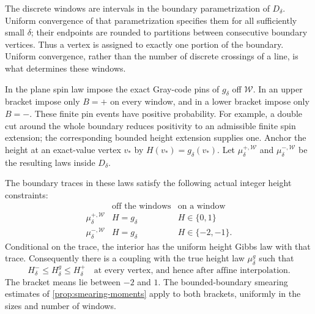 The discrete windows are intervals in the boundary parametrization of
$D_\delta$.  Uniform convergence of that parametrization specifies
them for all sufficiently small $\delta$; their endpoints are rounded
to partitions between consecutive boundary vertices.  Thus a vertex
is assigned to exactly one portion of the boundary.  Uniform
convergence, rather than the number of discrete crossings of a line,
is what determines these windows.

In the plane spin law impose the exact Gray-code pins of $g_\delta$
off $\mathcal W$.  In an upper bracket impose only $B=+$ on every
window, and in a lower bracket impose only $B=-$.  These finite pin
events have positive probability.  For example, a double cut around
the whole boundary reduces positivity to an admissible finite spin
extension; the corresponding bounded height extension supplies one.
Anchor the height at an exact-value vertex $v_*$ by
$H(v_*)=g_\delta(v_*)$.  Let $\mu^{+,\mathcal W}_\delta$ and
$\mu^{-,\mathcal W}_\delta$ be the resulting laws inside $D_\delta$.

\begin{lemma}\label{lem:boundary-brackets}
The boundary traces in these laws satisfy the following actual integer
height constraints:
\begin{equation}\label{eq:bracket-intervals}
\begin{array}{c|cc}
 & \text{off the windows}&\text{on a window}\\ \hline
 \mu^{+,\mathcal W}_\delta & H=g_\delta&H\in\{0,1\}\\
 \mu^{-,\mathcal W}_\delta & H=g_\delta&H\in\{-2,-1\}.
\end{array}
\end{equation}
Conditional on the trace, the interior has the uniform height Gibbs
law with that trace.  Consequently there is a coupling with the true
height law $\mu^g_\delta$ such that
\begin{equation}\label{eq:bracket-order}
 H^-_\delta\le H^g_\delta\le H^+_\delta
 \quad\text{at every vertex, and hence after affine interpolation}.
\end{equation}
The bracket means lie between $-2$ and $1$.  The bounded-boundary
smearing estimates of \cref{prop:smearing-moments} apply to both
brackets, uniformly in the sizes and number of windows.
\end{lemma}

